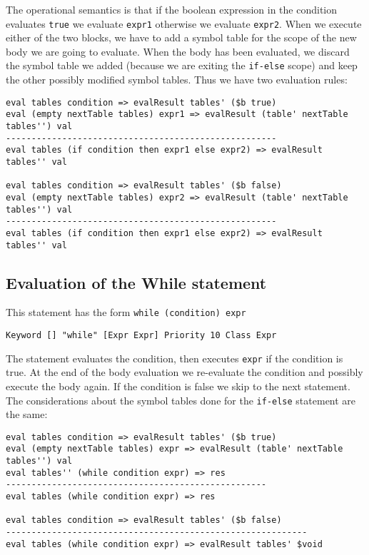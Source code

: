 \noindent
The operational semantics is that if the boolean expression in the condition evaluates \texttt{true} we evaluate \texttt{expr1} otherwise we evaluate \texttt{expr2}. When we execute either of the two blocks, we have to add a symbol table for the scope of the new body we are going to evaluate. When the body has been evaluated, we discard the symbol table we added (because we are exiting the \texttt{if-else} scope) and keep the other possibly modified symbol tables. Thus we have two evaluation rules:

\begin{lstlisting}
eval tables condition => evalResult tables' ($b true)
eval (empty nextTable tables) expr1 => evalResult (table' nextTable tables'') val
-----------------------------------------------------
eval tables (if condition then expr1 else expr2) => evalResult tables'' val

eval tables condition => evalResult tables' ($b false)
eval (empty nextTable tables) expr2 => evalResult (table' nextTable tables'') val
-----------------------------------------------------
eval tables (if condition then expr1 else expr2) => evalResult tables'' val
\end{lstlisting}

\subsection{Evaluation of the While statement}
This statement has the form \texttt{while (condition) expr}

\begin{lstlisting}
Keyword [] "while" [Expr Expr] Priority 10 Class Expr
\end{lstlisting}

The statement evaluates the condition, then executes \texttt{expr} if the condition is true. At the end of the body evaluation we re-evaluate the condition and possibly execute the body again. If the condition is false we skip to the next statement. The considerations about the symbol tables done for the \texttt{if-else} statement are the same:

\begin{lstlisting}
eval tables condition => evalResult tables' ($b true)
eval (empty nextTable tables) expr => evalResult (table' nextTable tables'') val
eval tables'' (while condition expr) => res
---------------------------------------------------
eval tables (while condition expr) => res

eval tables condition => evalResult tables' ($b false)
-----------------------------------------------------------
eval tables (while condition expr) => evalResult tables' $void
\end{lstlisting}

